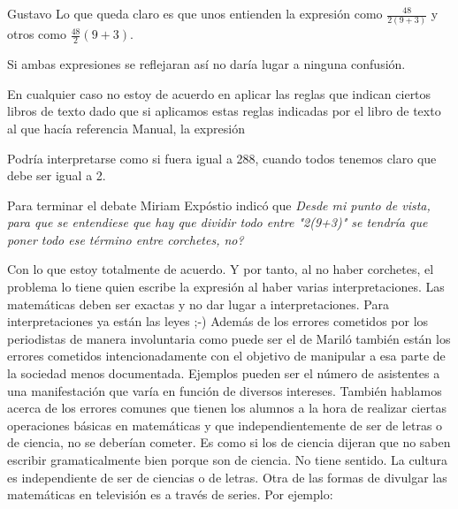 \begin{opin}{\guscolor}{Gustavo}
Lo que queda claro es que unos entienden la expresión como $\frac{48}{2(9+3)}$ y otros como $\frac{48}{2}(9+3)$.

Si ambas expresiones se reflejaran así no daría lugar a ninguna confusión.

En cualquier caso no estoy de acuerdo en aplicar las reglas que indican ciertos libros de texto dado que si aplicamos estas reglas indicadas por el libro de texto al que hacía referencia Manual, la expresión 

Podría interpretarse como si fuera igual a 288, cuando todos tenemos claro que debe ser igual a 2.

Para terminar el debate Miriam Expóstio indicó que 
\textit{Desde mi punto de vista, para que se entendiese que hay que dividir todo entre "2(9+3)" se tendría que poner todo ese término entre corchetes, no?}


Con lo que estoy totalmente de acuerdo. Y por tanto, al no haber corchetes, el problema lo tiene quien escribe la expresión al haber varias interpretaciones.
Las matemáticas deben ser exactas y no dar lugar a interpretaciones. Para interpretaciones ya están las leyes ;-)
Además de los errores cometidos por los periodistas de manera involuntaria como puede ser el de Mariló también están los errores cometidos intencionadamente con el objetivo de manipular a esa parte de la sociedad menos documentada. Ejemplos pueden ser el número de asistentes a una manifestación que varía en función de diversos intereses.
También hablamos acerca de los errores comunes que tienen los alumnos a la hora de realizar ciertas operaciones básicas en matemáticas y que independientemente de ser de letras o de ciencia, no se deberían cometer. Es como si los de ciencia dijeran que no saben escribir gramaticalmente bien porque son de ciencia. No tiene sentido. La cultura es independiente de ser de ciencias o de letras.
Otra de las formas de divulgar las matemáticas en televisión es a través de series. Por ejemplo:


\end{opin}
